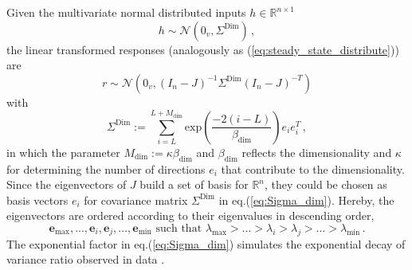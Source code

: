 \documentclass[11pt]{article}
\begin{document}
{	Given the multivariate normal distributed inputs $h \in \mathbb{R}^{n \times 1}$
		\begin{equation} \label{eq:input_distribution_dimensionality}
			h \sim \mathcal{N}(0_v, \Sigma^{\text{Dim}}) \, ,
		\end{equation}
	the linear transformed responses (analogously as (\ref{eq:steady_state_distribute})) are
		\begin{equation} \label{eq:response_distribution_dimensionality}
			r \sim \mathcal{N}(0_v, (I_n - J)^{-1} \Sigma^{\text{Dim}} (I_n - J)^{-T})
		\end{equation}
	with 
		\begin{equation} \label{eq:Sigma_dim}
			\Sigma^{\text{Dim}} := \sum_{i=L}^{L+M_{\text{dim}}} \text{exp}\left(\frac{-2(i-L)}{\beta_{\text{dim}}}\right) e_i e_i^T \, , 
		\end{equation}
	in which the parameter $M_{\text{dim}} := \kappa \beta_{\text{dim}}$ and $\beta_{\text{dim}}$ reflects the dimensionality \cite{tragenap2023nature} and $\kappa$ for determining the number of directions $e_i$ that contribute to the dimensionality. Since the eigenvectors of $J$ build a set of basis for $\mathbb{R}^n$, they could be chosen as basis vectors $e_i$ for covariance matrix $\Sigma^{\text{Dim}}$ in eq.(\ref{eq:Sigma_dim}). Hereby, the eigenvectors are ordered according to their eigenvalues in descending order, 
		\begin{equation} \label{eq:descding_order}
			\mathbf{e}_{\text{max}}, ..., \mathbf{e}_i, \mathbf{e}_j, ..., \mathbf{e}_{\text{min}} \, \, \text{such that} \, \, 	\lambda_{\text{max}} > ...> \lambda_i > \lambda_j > ... > \lambda_{\text{min}} \, .
		\end{equation}
	The exponential factor in eq.(\ref{eq:Sigma_dim}) simulates the exponential decay of variance ratio observed in data \cite{tragenap2023nature}. 
	
}
\end{document}
